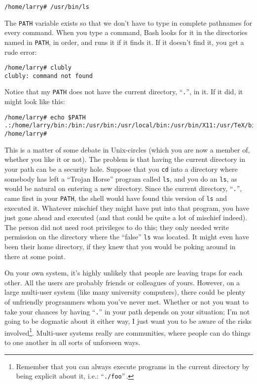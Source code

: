 \begin{screen}\begin{verbatim}
/home/larry# /usr/bin/ls
\end{verbatim}\end{screen}

        The {\tt PATH} variable exists so that we don't have to type
in complete pathnames for every command.  When you type a command,
Bash looks for it in the directories named in {\tt PATH}, in order,
and runs it if it finds it.  If it doesn't find it, you get a rude
error:

\begin{screen}\begin{verbatim}
/home/larry# clubly
clubly: command not found
\end{verbatim}\end{screen}

        Notice that my {\tt PATH} does not have the current directory,
``{\tt .}'', in it.  If it did, it might look like this:

\begin{screen}\begin{verbatim}
/home/larry# echo $PATH
.:/home/larry/bin:/bin:/usr/bin:/usr/local/bin:/usr/bin/X11:/usr/TeX/bin
/home/larry#
\end{verbatim}\end{screen}

        This is a matter of some debate in Unix-circles (which you are
now a member of, whether you like it or not).  The problem is that
having the current directory in your path can be a security hole.
Suppose that you {\tt cd} into a directory where somebody has left a
``Trojan Horse'' program called {\tt ls}, and you do an {\tt ls}, as
would be natural on entering a new directory.  Since the current
directory, ``{\tt .}'', came first in your {\tt PATH}, the shell would
have found this version of {\tt ls} and executed it.  Whatever
mischief they might have put into that program, you have just gone
ahead and executed (and that could be quite a lot of mischief indeed).
The person did not need root privileges to do this; they only needed
write permission on the directory where the ``false'' {\tt ls} was
located.  It might even have been their home directory, if they knew
that you would be poking around in there at some point.

        On your own system, it's highly unlikely that people are
leaving traps for each other.  All the users are probably friends or
colleagues of yours.  However, on a large multi-user system (like many
university computers), there could be plenty of unfriendly programmers
whom you've never met.  Whether or not you want to take your chances
by having ``{\tt .}'' in your path depends on your situation; I'm not
going to be dogmatic about it either way, I just want you to be aware
of the risks involved\footnote{Remember that you can always execute
programs in the current directory by being explicit about it, i.e.:
``{\tt ./foo}''\,.}.  Multi-user systems really are communities, where
people can do things to one another in all sorts of unforseen ways.

